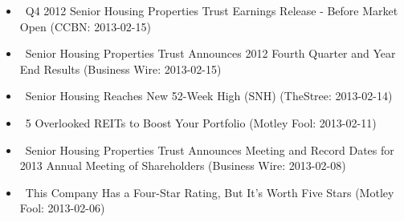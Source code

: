 \documentclass[11pt,asymmetric]{article}
\begin{document}
\begin{itemize}
\item\ Q4 2012 Senior Housing Properties Trust Earnings Release - Before Market Open (CCBN: 2013-02-15)
\item\ Senior Housing Properties Trust Announces 2012 Fourth Quarter and Year End Results (Business Wire: 2013-02-15)
\item\ Senior Housing Reaches New 52-Week High (SNH) (TheStree: 2013-02-14)
\item\ 5 Overlooked REITs to Boost Your Portfolio (Motley Fool: 2013-02-11)
\item\ Senior Housing Properties Trust Announces Meeting and Record Dates for 2013 Annual Meeting of Shareholders (Business Wire: 2013-02-08)
\item\ This Company Has a Four-Star Rating, But It’s Worth Five Stars (Motley Fool: 2013-02-06)
\end{itemize}
\end{document}
